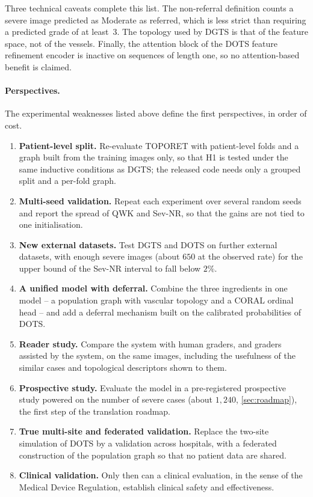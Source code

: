 Three technical caveats complete this list. The non-referral definition counts a severe
image predicted as Moderate as referred, which is less strict than requiring a predicted
grade of at least~$3$. The topology used by DGTS is that of the feature space, not of the
vessels. Finally, the attention block of the DOTS feature refinement encoder is inactive
on sequences of length one, so no attention-based benefit is claimed.

\label{sec:persp-gc}
\paragraph{Perspectives.}
The experimental weaknesses listed above define the first perspectives, in order of cost.
\begin{enumerate}[leftmargin=1.6em,itemsep=2pt]
\item \textbf{Patient-level split.} Re-evaluate TOPORET with patient-level folds and a graph
built from the training images only, so that H1 is tested under the same inductive
conditions as DGTS; the released code needs only a grouped split and a per-fold graph.
\item \textbf{Multi-seed validation.} Repeat each experiment over several random seeds and
report the spread of QWK and Sev-NR, so that the gains are not tied to one initialisation.
\item \textbf{New external datasets.} Test DGTS and DOTS on further external datasets, with
enough severe images (about $650$ at the observed rate) for the upper bound of the Sev-NR
interval to fall below $2\%$.
\item \textbf{A unified model with deferral.} Combine the three ingredients in one model --
a population graph with vascular topology and a CORAL ordinal head -- and add a deferral
mechanism built on the calibrated probabilities of DOTS.
\item \textbf{Reader study.} Compare the system with human graders, and graders assisted
by the system, on the same images, including the usefulness of the similar cases and
topological descriptors shown to them.
\item \textbf{Prospective study.} Evaluate the model in a pre-registered prospective study
powered on the number of severe cases (about $1{,}240$, \cref{sec:roadmap}), the first
step of the translation roadmap.
\item \textbf{True multi-site and federated validation.} Replace the two-site simulation of
DOTS by a validation across hospitals, with a federated construction of the population
graph so that no patient data are shared.
\item \textbf{Clinical validation.} Only then can a clinical evaluation, in the sense of
the Medical Device Regulation, establish clinical safety and effectiveness.
\end{enumerate}
